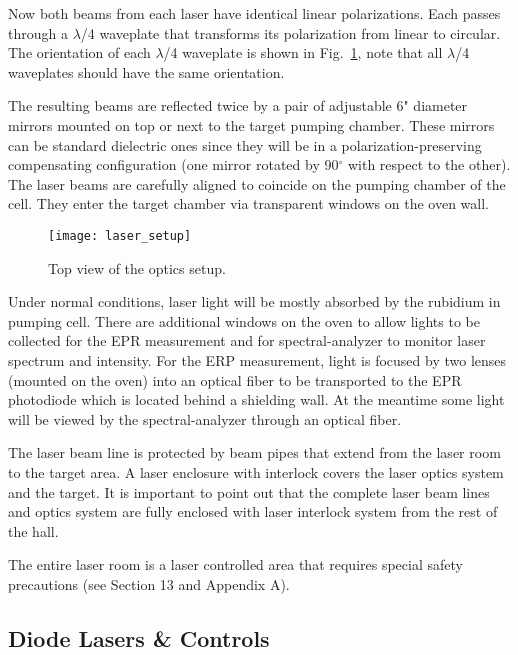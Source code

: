 {Now both beams from each laser have identical linear
polarizations.  Each passes through a $\lambda$/4 waveplate that
transforms its polarization from linear to circular.  The orientation of 
each $\lambda$/4 waveplate is shown in Fig.~\ref{fig:laser_setup}, note that 
all $\lambda$/4 waveplates should have the same orientation.

The resulting beams are reflected twice by a
pair of adjustable 6" diameter mirrors mounted on top or
next to the target pumping chamber. These mirrors can be
standard dielectric ones since they will be in a
polarization-preserving compensating configuration (one mirror rotated
by 90$^\circ$ with respect to the other). 
The laser beams are carefully aligned to coincide on the pumping chamber 
of the cell.  They enter the target chamber via transparent
windows on the oven wall.
  

\begin{figure}
\begin{center}
\centerline{\texttt{[image: laser\_setup]}}
\end{center}
\caption[Top view of the optics setup]%
{Top view of the optics setup.}
\label{fig:laser_setup}
\end{figure}

Under normal conditions, laser light
will be mostly absorbed by the rubidium in pumping cell.
There are additional windows on the oven to allow lights to be
collected for the EPR measurement and for spectral-analyzer to monitor
laser spectrum and intensity.  
For the ERP measurement, light is focused by two lenses (mounted on the oven) 
into an optical fiber to be transported to 
the EPR photodiode which is located behind a shielding wall.
At the meantime some light will be viewed 
by the spectral-analyzer through an optical fiber.

The laser beam line is
protected by beam pipes that extend from the laser room to the target
area. A laser enclosure with interlock covers the laser optics system and 
the target. It is important to point out that the complete laser beam lines 
and optics system are fully enclosed with laser interlock system from the 
rest of the hall.

\begin{safetyen}{10}{5}
The entire laser room is a laser controlled area that requires special
safety precautions (see Section 13 and Appendix A).
\end{safetyen}

\subsection{Diode Lasers \& Controls}

}
